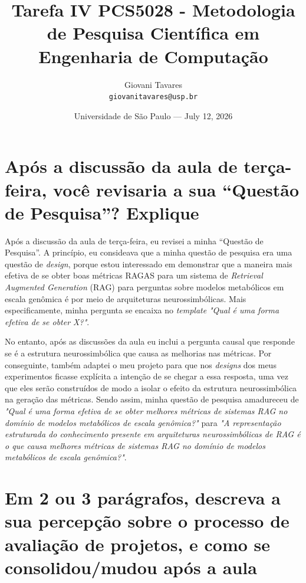 \documentclass{article}
\title{Tarefa IV PCS5028 - Metodologia de Pesquisa Científica em Engenharia de Computação} %
\author{Giovani Tavares\\ \texttt{giovanitavares@usp.br}} %
\date{Universidade de São Paulo --- July 12, 2026} %
\begin{document}
\maketitle %






\section{Após a discussão da aula de terça-feira, você revisaria a sua “Questão de Pesquisa”? Explique}

Após a discussão da aula de terça-feira, eu revisei a minha “Questão de Pesquisa”.
A princípio, eu consideava que a minha questão de pesquisa era uma questão de \textit{design}, porque estou interessado em demonstrar que a maneira mais efetiva de se obter boas métricas RAGAS \cite{es-etal-2024-ragas,} para um sistema de \textit{Retrieval Augmented Generation} (RAG) \cite{lewis2020retrieval}  para perguntas sobre modelos metabólicos em escala genômica é por meio de arquiteturas neurossimbólicas. Mais especificamente, minha pergunta se encaixa no \textit{template} \textit{"Qual é uma forma efetiva de se obter X?"}.

No entanto, após as discussões da aula eu inclui a pergunta causal que responde se é a estrutura neurossimbólica que causa as melhorias nas métricas. Por conseguinte, também adaptei o meu projeto para que nos \textit{designs} dos meus experimentos ficasse explícita a intenção de se chegar a essa resposta, uma vez que eles serão construídos de modo a isolar o efeito da estrutura neurossimbólica na geração das métricas. Sendo assim, minha questão de pesquisa amadureceu de \textit{"Qual é uma forma efetiva de se obter melhores métricas de sistemas RAG no domínio de modelos metabólicos de escala genômica?"} para \textit{"A representação estruturada do conhecimento presente em arquiteturas neurossimbólicas de RAG é o que causa melhores métricas de sistemas RAG no domínio de modelos metabólicos de escala genômica?"}.


\section{Em 2 ou 3 parágrafos, descreva a sua percepção sobre o processo de avaliação de projetos, e como se consolidou/mudou após a aula}
\end{document}
